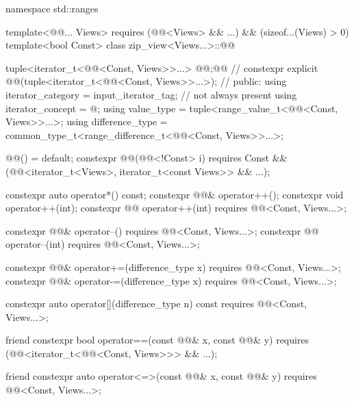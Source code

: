%
\begin{codeblock}
namespace std::ranges {
  template<@@... Views>
    requires (@@<Views> && ...) && (sizeof...(Views) > 0)
  template<bool Const>
  class zip_view<Views...>::@@ {
    tuple<iterator_t<@@<Const, Views>>...> @@;@\itcorr[-1]@       // \expos
    constexpr explicit @@(tuple<iterator_t<@@<Const, Views>>...>);
                                                                            // \expos
  public:
    using iterator_category = input_iterator_tag;                           // not always present
    using iterator_concept  = @\seebelow@;
    using value_type = tuple<range_value_t<@@<Const, Views>>...>;
    using difference_type = common_type_t<range_difference_t<@@<Const, Views>>...>;

    @@() = default;
    constexpr @@(@@<!Const> i)
      requires Const && (@@<iterator_t<Views>, iterator_t<const Views>> && ...);

    constexpr auto operator*() const;
    constexpr @@& operator++();
    constexpr void operator++(int);
    constexpr @@ operator++(int) requires @@<Const, Views...>;

    constexpr @@& operator--() requires @@<Const, Views...>;
    constexpr @@ operator--(int) requires @@<Const, Views...>;

    constexpr @@& operator+=(difference_type x)
      requires @@<Const, Views...>;
    constexpr @@& operator-=(difference_type x)
      requires @@<Const, Views...>;

    constexpr auto operator[](difference_type n) const
      requires @@<Const, Views...>;

    friend constexpr bool operator==(const @@& x, const @@& y)
      requires (@@<iterator_t<@@<Const, Views>>> && ...);

    friend constexpr auto operator<=>(const @@& x, const @@& y)
      requires @@<Const, Views...>;

}}
\end{codeblock}
